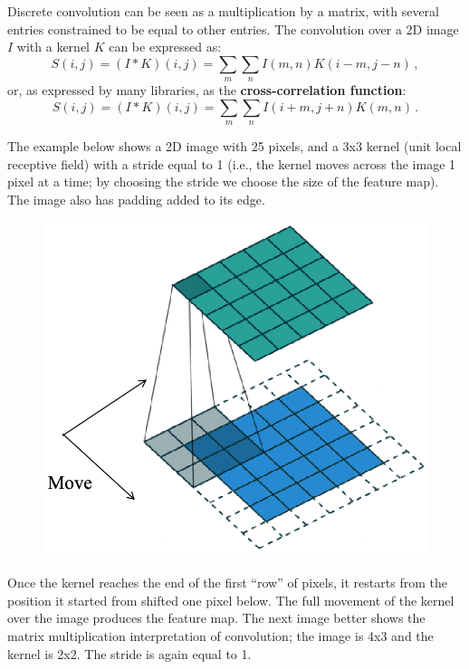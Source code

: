 Discrete convolution can be seen as a multiplication by a matrix, with several entries constrained to be equal to other entries. The convolution over a 2D image $I$ with a kernel $K$ can be expressed as:
\begin{equation*}
    S(i,j) = (I*K)(i,j) = \sum_m \sum_n I(m,n)K(i-m, j-n) \,,
\end{equation*}
or, as expressed by many libraries, as the \textbf{cross-correlation function}:
\begin{equation*}
    S(i,j) = (I*K)(i,j) = \sum_m \sum_n I(i+m,j+n)K(m, n) \,.
\end{equation*}

The example below shows a 2D image with 25 pixels, and a 3x3 kernel (unit local receptive field) with a stride equal to 1 (i.e., the kernel moves across the image 1 pixel at a time; by choosing the stride we choose the size of the feature map). The image also has padding added to its edge.
\begin{figure}[h]
    \centering
    \includegraphics[width=0.6\linewidth]{img/CNN_2D.png} 
\end{figure}

Once the kernel reaches the end of the first ``row'' of pixels, it restarts from the position it started from shifted one pixel below. The full movement of the kernel over the image produces the feature map. The next image better shows the matrix multiplication interpretation of convolution; the image is 4x3 and the kernel is 2x2. The stride is again equal to 1.

